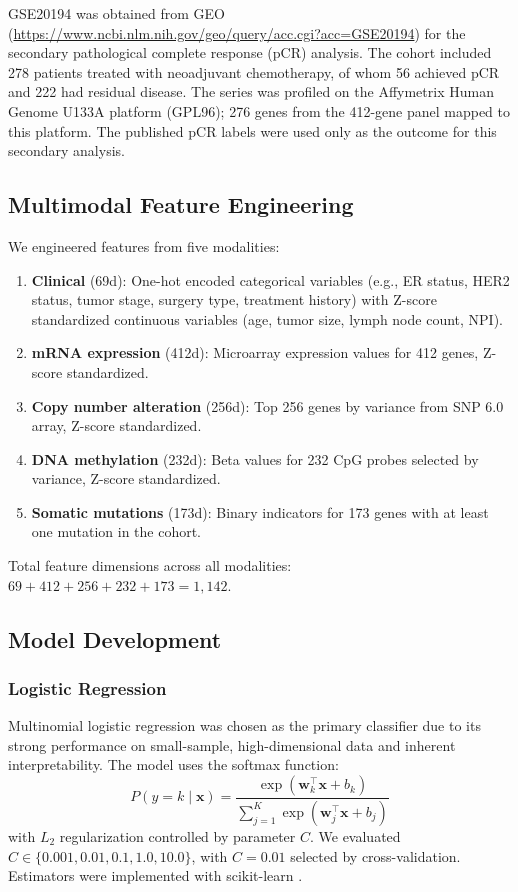 \documentclass[11pt,a4paper]{article}
\begin{document}
GSE20194 was obtained from GEO (\url{https://www.ncbi.nlm.nih.gov/geo/query/acc.cgi?acc=GSE20194}) for the secondary pathological complete response (pCR) analysis. The cohort included 278 patients treated with neoadjuvant chemotherapy, of whom 56 achieved pCR and 222 had residual disease. The series was profiled on the Affymetrix Human Genome U133A platform (GPL96); 276 genes from the 412-gene panel mapped to this platform. The published pCR labels were used only as the outcome for this secondary analysis.

\subsection{Multimodal Feature Engineering}
\label{sec:features}

We engineered features from five modalities:
\begin{enumerate}[nosep]
  \item \textbf{Clinical} (69d): One-hot encoded categorical variables (e.g., ER status, HER2 status, tumor stage, surgery type, treatment history) with Z-score standardized continuous variables (age, tumor size, lymph node count, NPI).
  \item \textbf{mRNA expression} (412d): Microarray expression values for 412 genes, Z-score standardized.
  \item \textbf{Copy number alteration} (256d): Top 256 genes by variance from SNP 6.0 array, Z-score standardized.
  \item \textbf{DNA methylation} (232d): Beta values for 232 CpG probes selected by variance, Z-score standardized.
  \item \textbf{Somatic mutations} (173d): Binary indicators for 173 genes with at least one mutation in the cohort.
\end{enumerate}

Total feature dimensions across all modalities: $69 + 412 + 256 + 232 + 173 = 1{,}142$.

\subsection{Model Development}
\label{sec:models}

\subsubsection{Logistic Regression}
Multinomial logistic regression was chosen as the primary classifier due to its strong performance on small-sample, high-dimensional data and inherent interpretability. The model uses the softmax function:
\begin{equation}
  P(y = k \mid \mathbf{x}) = \frac{\exp(\mathbf{w}_k^\top \mathbf{x} + b_k)}{\sum_{j=1}^{K} \exp(\mathbf{w}_j^\top \mathbf{x} + b_j)}
  \label{eq:softmax}
\end{equation}
with $L_2$ regularization controlled by parameter $C$. We evaluated $C \in \{0.001, 0.01, 0.1, 1.0, 10.0\}$, with $C = 0.01$ selected by cross-validation. Estimators were implemented with scikit-learn \citep{pedregosa2011scikit}.
\end{document}
